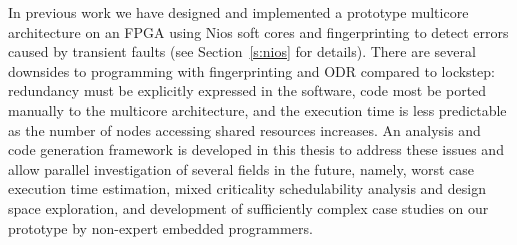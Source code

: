 % 
	
	In previous work we have designed and implemented a prototype multicore architecture on an FPGA using Nios soft cores and fingerprinting to detect errors caused by transient faults \cite{ugthesis} (see Section~\ref{s:nios} for details). 
	There are several downsides to programming with fingerprinting and ODR compared to lockstep: redundancy must be explicitly expressed in the software, code most be ported manually to the multicore architecture, and the execution time is less predictable as the number of nodes accessing shared resources increases. 
	An analysis and code generation framework is developed in this thesis to address these issues and allow parallel investigation of several fields in the future, namely, worst case execution time estimation, mixed criticality schedulability analysis and design space exploration, and development of sufficiently complex case studies on our prototype by non-expert embedded programmers.
	
